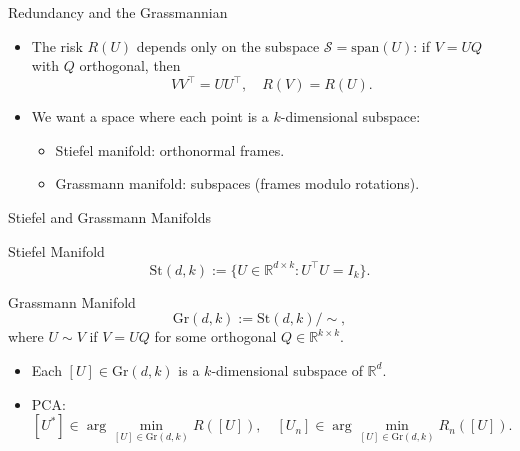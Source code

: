 \documentclass{beamer}
\newcommand{\R}{\mathbb{R}}
\newcommand{\Gr}{\mathrm{Gr}}
\newcommand{\St}{\mathrm{St}}
\newcommand{\1}{\mathbbm{1}}
\begin{document}
\begin{frame}{Redundancy and the Grassmannian} %
  \begin{itemize}
    \item The risk $R(U)$ depends only on the subspace $\mathcal{S} = \text{span}(U)$:
    if $V = UQ$ with $Q$ orthogonal, then
    \[
      V V^\top = U U^\top, \quad R(V) = R(U).
    \]
    \item We want a space where each point is a $k$-dimensional subspace:
    \begin{itemize}
      \item Stiefel manifold: orthonormal frames.
      \item Grassmann manifold: subspaces (frames modulo rotations).
    \end{itemize}
  \end{itemize}
\end{frame}

\begin{frame}{Stiefel and Grassmann Manifolds} %
  \begin{block}{Stiefel Manifold}
    \[
      \St(d,k) := \{ U \in \R^{d\times k} : U^\top U = I_k \}.
    \]
  \end{block}
  \begin{block}{Grassmann Manifold}
    \[
      \Gr(d,k) := \St(d,k) / \sim,
    \]
    where $U \sim V$ if $V = UQ$ for some orthogonal $Q \in \R^{k\times k}$.
  \end{block}
  \begin{itemize}
    \item Each $[U] \in \Gr(d,k)$ is a $k$-dimensional subspace of $\R^d$.
    \item PCA:
    \[
      [U^\ast] \in \arg\min_{[U]\in\Gr(d,k)} R([U]),
      \quad
      [U_n] \in \arg\min_{[U]\in\Gr(d,k)} R_n([U]).
    \]
  \end{itemize}
\end{frame}
\end{document}
